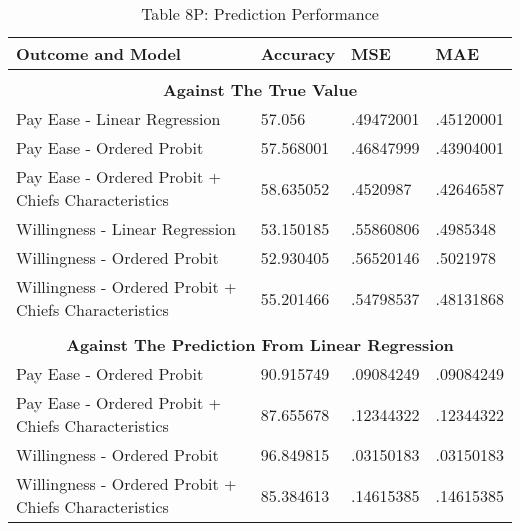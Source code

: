 \begin{table}[H]
	\begin{center}
\caption*{Table 8P: Prediction Performance}
\begin{tabular}{|l|l|l|l|}\hline  
 \textbf{Outcome and Model}& \textbf{Accuracy}  & \textbf{MSE}  & \textbf{MAE}  \\ \hline  
 \multicolumn{4}{c}{ } \\
 \multicolumn{4}{c}{\textbf{Against The True Value}} \\\hline
Pay Ease - Linear Regression & 57.056 & .49472001 & .45120001 \\ \hline 
Pay Ease - Ordered Probit & 57.568001 & .46847999 & .43904001 \\ \hline 
Pay Ease - Ordered Probit + Chiefs Characteristics  & 58.635052 & .4520987 & .42646587 \\ \hline 
Willingness - Linear Regression & 53.150185 & .55860806 & .4985348 \\ \hline 
Willingness - Ordered Probit & 52.930405 & .56520146 & .5021978 \\ \hline 
Willingness - Ordered Probit + Chiefs Characteristics   & 55.201466 & .54798537 & .48131868 \\ \hline

 \multicolumn{4}{c}{ } \\
 \multicolumn{4}{c}{\textbf{Against The Prediction From Linear Regression }} \\\hline
Pay Ease - Ordered Probit  & 90.915749 & .09084249 & .09084249 \\ \hline 
Pay Ease - Ordered Probit + Chiefs Characteristics & 87.655678 & .12344322 & .12344322 \\ \hline 
Willingness - Ordered Probit & 96.849815 & .03150183 & .03150183 \\ \hline 
Willingness - Ordered Probit + Chiefs Characteristics & 85.384613 & .14615385 & .14615385 \\ \hline 
  \end{tabular}
	\end{center}
\end{table}

